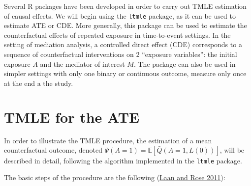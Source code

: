 \documentclass[
]{book}
\begin{document}
Several R packages have been developed in order to carry out TMLE estimation of causal effects. We will begin using the \texttt{ltmle} package, as it can be used to estimate ATE or CDE. More generally, this package can be used to estimate the counterfactual effects of repeated exposure in time-to-event settings. In the setting of mediation analysis, a controlled direct effect (CDE) corresponds to a sequence of counterfactual interventions on 2 ``exposure variables'': the initial exposure \(A\) and the mediator of interest \(M\). The package can also be used in simpler settings with only one binary or continuous outcome, measure only once at the end a the study.

\hypertarget{tmle-for-the-ate}{%
\section{TMLE for the ATE}\label{tmle-for-the-ate}}

In order to illustrate the TMLE procedure, the estimation of a mean counterfactual outcome, denoted \(\Psi(A=1) = \mathbb{E} \left[\bar{Q}(A=1,L(0))\right]\), will be described in detail, following the algorithm implemented in the \texttt{ltmle} package.

The basic steps of the procedure are the following (\protect\hyperlink{ref-vanderlaan_book2011}{Laan and Rose 2011}):
\end{document}
